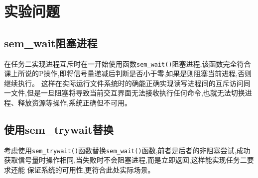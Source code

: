 \section{实验问题}
\subsection{sem\_wait阻塞进程}
在任务二实现进程互斥时在一开始使用函数\texttt{sem\_wait()}阻塞进程,该函数完全符合课上所说的P操作,即将信号量递减后判断是否小于零,如果是则阻塞当前进程,否则继续执行。
这样在实际运行文件系统时的确能正确实现读写进程间的互斥访问同一文件,但是一旦阻塞将导致当前交互界面无法接收执行任何命令,也就无法切换进程、释放资源等操作,系统正确但不可用。
\subsection{使用sem\_trywait替换}
考虑使用\texttt{sem\_trywait()}函数替换\texttt{sem\_wait()}函数,前者是后者的非阻塞尝试,成功获取信号量时操作相同,当失败时不会阻塞进程,而是立即返回,这样能实现任务二要求还能
保证系统的可用性,更符合此处实际场景。